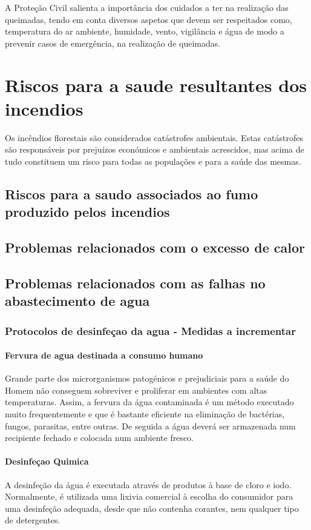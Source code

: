 \documentclass[a4paper,11pt,onecloumn,oneside]{article}
\begin{document}
A Proteção Civil salienta a importância dos cuidados a ter na realização das queimadas, tendo em conta diversos aspetos que devem ser respeitados como, temperatura do ar ambiente, humidade, vento, vigilância e água de modo a prevenir casos de emergência, na realização de queimadas.

\part{Riscos para a saude resultantes dos incendios}
Os incêndios florestais são considerados catástrofes ambientais. Estas catástrofes são responsáveis por prejuízos económicos e ambientais acrescidos, mas acima de tudo constituem um risco para todas as populações e para a saúde das mesmas.

\chapter{Riscos para a saudo associados ao fumo produzido pelos incendios}

\chapter{Problemas relacionados com o excesso de calor}


\chapter{Problemas relacionados com as falhas no abastecimento de agua}

\section{Protocolos de desinfeçao da agua - Medidas a incrementar}

\subsection{Fervura de agua destinada a consumo humano}
Grande parte dos microrganismos patogénicos e prejudiciais para a saúde do Homem não conseguem sobreviver e proliferar em ambientes com altas temperaturas. Assim, a fervura da água contaminada é um método executado muito frequentemente e que é bastante eficiente na eliminação de bactérias, fungos, parasitas, entre outras. De seguida a água deverá ser armazenada num recipiente fechado e colocada num ambiente fresco.

\subsection{Desinfeçao Quimica}
A desinfeção da água é executada através de produtos à base de cloro e iodo. Normalmente, é utilizada uma lixivia comercial à escolha do consumidor para uma desinfeção adequada, desde que não contenha corantes, nem qualquer tipo de detergentes. 
\end{document}

